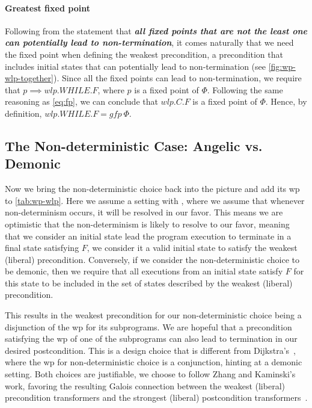 \paragraph{Greatest fixed point}
Following from the statement that \textbf{\textit{all fixed points that are not the least one can potentially lead to non-termination}}, it comes naturally that we need the  fixed point when defining the weakest  precondition, a precondition that includes  initial states that can potentially lead to non-termination (see \autoref{fig:wp-wlp-together}). 
Since all the fixed points can lead to non-termination, we require that $p \implies wlp.WHILE.F$, where $p$ is a fixed point of $\Phi$.
Following the same reasoning as \autoref{eq:fp}, we can conclude that $wlp.C.F$ is a fixed point of $\Phi$. 
Hence, by definition, $wlp.WHILE.F = gfp\ \Phi$. 


\subsection{The Non-deterministic Case: Angelic vs. Demonic}\label{sec:wp-nondet}
Now we bring the non-deterministic choice back into the picture and add its wp to \autoref{tab:wp-wlp}. 
Here we assume a setting with , where we assume that whenever non-determinism occurs, it will be resolved in our favor.
This means we are optimistic that the non-determinism is likely to resolve to our favor, meaning that we consider an initial state  lead the program execution to terminate in a final state satisfying $F$, we consider it a valid initial state to satisfy the weakest (liberal) precondition. 
Conversely, if we consider the non-deterministic choice to be demonic, then we require that all executions from an initial state  satisfy $F$ for this state to be included in the set of states described by the weakest (liberal) precondition. 

This results in the weakest precondition for our non-deterministic choice being a disjunction of the wp for its subprograms. 
We are hopeful that a precondition satisfying the wp of one of the subprograms can also lead to termination in our desired postcondition. 
This is a design choice that is different from Dijkstra's~\cite{dijkstra75}, where the wp for non-deterministic choice is a conjunction, hinting at a demonic setting. 
Both choices are justifiable, we choose to follow Zhang and Kaminski's work, favoring the resulting Galois connection between the weakest (liberal) precondition transformers and the strongest (liberal) postcondition transformers~\cite{zhang22}. 


